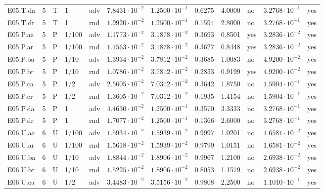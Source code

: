 {\begin{longtable}{@{}lllllllllll l@{}}
E05.T.da & 5 & T & 1 & adv & $7.8431\cdot 10^{-2}$ & $1.2500\cdot 10^{-1}$ & 0.6275 & 4.0000 & no & $3.2768\cdot 10^{-1}$ & yes \\
E05.T.dr & 5 & T & 1 & rnd & $1.9920\cdot 10^{-2}$ & $1.2500\cdot 10^{-1}$ & 0.1594 & 2.8000 & no & $3.2768\cdot 10^{-1}$ & yes \\
E05.P.aa & 5 & P & 1/100 & adv & $1.1773\cdot 10^{-2}$ & $3.1878\cdot 10^{-2}$ & 0.3693 & 0.8501 & yes & $3.2836\cdot 10^{-2}$ & yes \\
E05.P.ar & 5 & P & 1/100 & rnd & $1.1563\cdot 10^{-2}$ & $3.1878\cdot 10^{-2}$ & 0.3627 & 0.8448 & yes & $3.2836\cdot 10^{-2}$ & yes \\
E05.P.ba & 5 & P & 1/10 & adv & $1.3934\cdot 10^{-2}$ & $3.7812\cdot 10^{-2}$ & 0.3685 & 1.0083 & no & $4.9200\cdot 10^{-2}$ & yes \\
E05.P.br & 5 & P & 1/10 & rnd & $1.0786\cdot 10^{-2}$ & $3.7812\cdot 10^{-2}$ & 0.2853 & 0.9199 & yes & $4.9200\cdot 10^{-2}$ & yes \\
E05.P.ca & 5 & P & 1/2 & adv & $2.5605\cdot 10^{-2}$ & $7.0312\cdot 10^{-2}$ & 0.3642 & 1.8750 & no & $1.5904\cdot 10^{-1}$ & yes \\
E05.P.cr & 5 & P & 1/2 & rnd & $1.3605\cdot 10^{-2}$ & $7.0312\cdot 10^{-2}$ & 0.1935 & 1.4154 & no & $1.5904\cdot 10^{-1}$ & yes \\
E05.P.da & 5 & P & 1 & adv & $4.4630\cdot 10^{-2}$ & $1.2500\cdot 10^{-1}$ & 0.3570 & 3.3333 & no & $3.2768\cdot 10^{-1}$ & yes \\
E05.P.dr & 5 & P & 1 & rnd & $1.7077\cdot 10^{-2}$ & $1.2500\cdot 10^{-1}$ & 0.1366 & 2.6000 & no & $3.2768\cdot 10^{-1}$ & yes \\
E06.U.aa & 6 & U & 1/100 & adv & $1.5934\cdot 10^{-2}$ & $1.5939\cdot 10^{-2}$ & 0.9997 & 1.0201 & no & $1.6581\cdot 10^{-2}$ & yes \\
E06.U.ar & 6 & U & 1/100 & rnd & $1.5618\cdot 10^{-2}$ & $1.5939\cdot 10^{-2}$ & 0.9799 & 1.0151 & no & $1.6581\cdot 10^{-2}$ & yes \\
E06.U.ba & 6 & U & 1/10 & adv & $1.8844\cdot 10^{-2}$ & $1.8906\cdot 10^{-2}$ & 0.9967 & 1.2100 & no & $2.6938\cdot 10^{-2}$ & yes \\
E06.U.br & 6 & U & 1/10 & rnd & $1.5225\cdot 10^{-2}$ & $1.8906\cdot 10^{-2}$ & 0.8053 & 1.1579 & no & $2.6938\cdot 10^{-2}$ & yes \\
E06.U.ca & 6 & U & 1/2 & adv & $3.4483\cdot 10^{-2}$ & $3.5156\cdot 10^{-2}$ & 0.9808 & 2.2500 & no & $1.1010\cdot 10^{-1}$ & yes \\

\end{longtable}}
